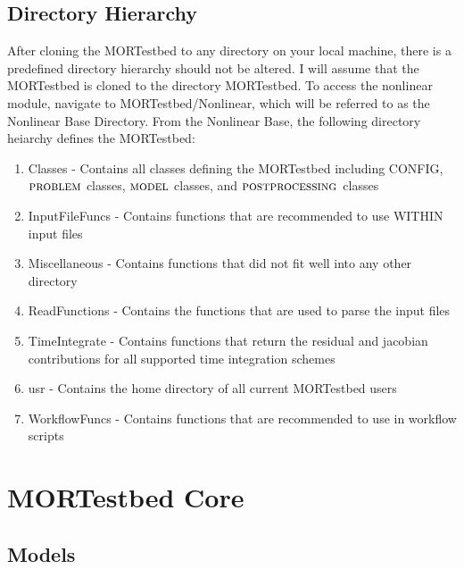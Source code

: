\documentclass[notitlepage]{report}
\newcommand{\model}{\ensuremath{\textsc{model }}}
\newcommand{\problem}{\ensuremath{\textsc{problem }}}
\newcommand{\post}{\ensuremath{\textsc{postprocessing }}}
\begin{document}
\section{Directory Hierarchy}
After cloning the MORTestbed to any directory on your local machine, there is a predefined directory hierarchy should not be altered.  I will assume that the MORTestbed is cloned to the directory MORTestbed.  To access the nonlinear module, navigate to MORTestbed/Nonlinear, which will be referred to as the Nonlinear Base Directory.  From the Nonlinear Base, the following directory heiarchy defines the MORTestbed:
\begin{enumerate}
\item Classes - Contains all classes defining the MORTestbed including CONFIG, \problem classes, \model classes, and \post classes
\item InputFileFuncs - Contains functions that are recommended to use WITHIN input files
\item Miscellaneous - Contains functions that did not fit well into any other directory
\item ReadFunctions - Contains the functions that are used to parse the input files
\item TimeIntegrate - Contains functions that return the residual and jacobian contributions for all supported time integration schemes
\item usr - Contains the home directory of all current MORTestbed users
\item WorkflowFuncs - Contains functions that are recommended to use in workflow scripts
\end{enumerate} 


\chapter{MORTestbed Core} \label{ch:core}
\section{Models}
\end{document}
